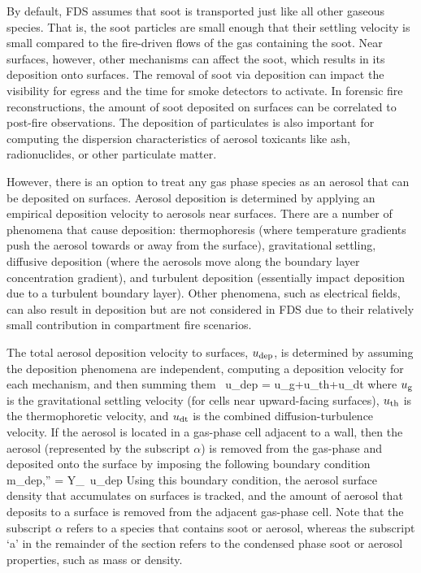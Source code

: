 By default, FDS assumes that soot is transported just like all other gaseous species. That is, the soot particles are small enough that their settling velocity is small compared to the fire-driven flows of the gas containing the soot. Near surfaces, however, other mechanisms can affect the soot, which results in its deposition onto surfaces. The removal of soot via deposition can impact the visibility for egress and the time for smoke detectors to activate. In forensic fire reconstructions, the amount of soot deposited on surfaces can be correlated to post-fire observations. The deposition of particulates is also important for computing the dispersion characteristics of aerosol toxicants like ash, radionuclides, or other particulate matter.

However, there is an option to treat any gas phase species as an aerosol that can be deposited on surfaces. Aerosol deposition is determined by applying an empirical deposition velocity to aerosols near surfaces. There are a number of phenomena that cause deposition: thermophoresis (where temperature gradients push the aerosol towards or away from the surface), gravitational settling, diffusive deposition (where the aerosols move along the boundary layer concentration
gradient), and turbulent deposition (essentially impact deposition due to a turbulent boundary layer). Other phenomena, such as electrical fields, can also result in deposition but are not considered in FDS due to their relatively small contribution in compartment fire scenarios.

The total aerosol deposition velocity to surfaces, $u_{\rm dep}$, is determined by assuming the deposition phenomena are independent, computing a deposition velocity for each mechanism, and then summing them~\cite{Bixler:1}
\be
u_{\rm dep} = u_{\rm g}+u_{\rm th}+u_{\rm dt}
\ee
where $u_{\rm g}$ is the gravitational settling velocity (for cells near upward-facing surfaces), $u_{\rm th}$ is the thermophoretic velocity, and $u_{\rm dt}$ is the combined diffusion-turbulence velocity. If the aerosol is located in a gas-phase cell adjacent to a wall, then the aerosol (represented by the subscript $\alpha$) is removed from the gas-phase and deposited onto the surface by imposing the following boundary condition
\be
\dot m_{\rm dep,\alpha}'' = \rho Y_\alpha \, u_{\rm dep}
\ee
Using this boundary condition, the aerosol surface density that accumulates on surfaces is tracked, and the amount
of aerosol that deposits to a surface is removed from the adjacent gas-phase cell.
Note that the subscript $\alpha$ refers to a species that contains soot or aerosol, whereas the subscript `a'
in the remainder of the section refers to the condensed phase soot or aerosol properties, such as mass or density.

